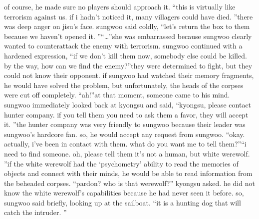 of course, he made sure no players should approach it.
“this is virtually like terrorism against us.
 if i hadn’t noticed it, many villagers could have died.
”there was deep anger on jisu’s face.
sungwoo said coldly, “let’s return the box to them because we haven’t opened it.
”“…”she was embarrassed because sungwoo clearly wanted to counterattack the enemy with terrorism.
sungwoo continued with a hardened expression, “if we don’t kill them now, somebody else could be killed.
 by the way, how can we find the enemy?”they were determined to fight, but they could not know their opponent.
 if sungwoo had watched their memory fragments, he would have solved the problem, but unfortunately, the heads of the corpses were cut off completely.
“ah!”at that moment, someone came to his mind.
sungwoo immediately looked back at kyongsu and said, “kyongsu, please contact hunter company.
 if you tell them you need to ask them a favor, they will accept it.
”the hunter company was very friendly to sungwoo because their leader was sungwoo’s hardcore fan.
 so, he would accept any request from sungwoo.
“okay.
 actually, i’ve been in contact with them.
 what do you want me to tell them?”“i need to find someone.
 oh, please tell them it’s not a human, but white werewolf.
”if the white werewolf had the ‘psychometry’ ability to read the memories of objects and connect with their minds, he would be able to read information from the beheaded corpses.
“pardon? who is that werewolf?” kyongsu asked.
he did not know the white werewolf’s capabilities because he had never seen it before.
so, sungwoo said briefly, looking up at the sailboat.
 “it is a hunting dog that will catch the intruder.
”

 